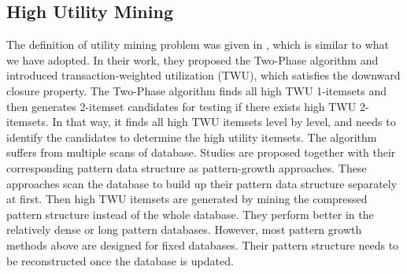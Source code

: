 \documentclass[runningheads,a4paper]{llncs}
\begin{document}
\subsection{High Utility Mining}
The definition of utility mining problem was given in \cite{Liu:two-phasewithCCPD}, which is similar to what we have adopted. In their work, they proposed the Two-Phase algorithm and introduced transaction-weighted utilization (TWU), which satisfies the downward closure property. The Two-Phase algorithm finds all high TWU 1-itemsets and then generates 2-itemset candidates for testing if there exists high TWU 2-itemsets. In that way, it finds all high TWU itemsets level by level, and needs to identify the candidates to determine the high utility itemsets. The algorithm suffers from multiple scans of database. Studies \cite{Ahmed:IHUP,Lin:for-um,Tseng:up-growth} are proposed together with their corresponding pattern data structure as pattern-growth approaches. These approaches scan the database to build up their pattern data structure separately at first. Then high TWU itemsets are generated by mining the compressed pattern structure instead of the whole database. They perform better in the relatively dense or long pattern databases. However, most pattern growth methods above are designed for fixed databases. Their pattern structure needs to be reconstructed once the database is updated.

\end{document}
